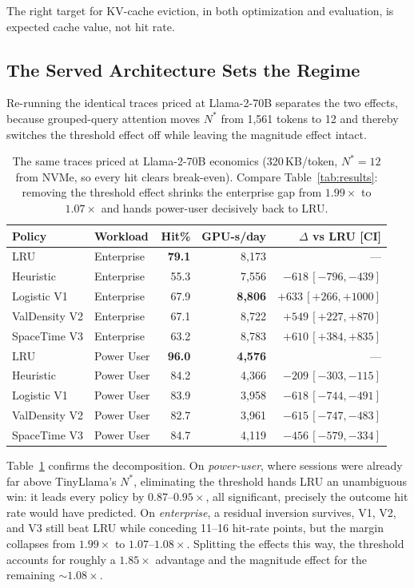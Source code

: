 \documentclass[letterpaper,twocolumn,10pt]{article}
\begin{document}
The right target for KV-cache eviction, in both optimization and evaluation, is expected cache value, not hit rate.

\subsection{The Served Architecture Sets the Regime}
\label{sec:arch}

Re-running the identical traces priced at Llama-2-70B separates the two effects, because grouped-query attention moves $N^{*}$ from 1,561 tokens to 12 and thereby switches the threshold effect off while leaving the magnitude effect intact.

\begin{table}[t]
\centering
\caption{The same traces priced at Llama-2-70B economics (320\,KB/token, $N^{*}{=}12$ from NVMe, so every hit clears break-even). Compare Table~\ref{tab:results}: removing the threshold effect shrinks the enterprise gap from $1.99\times$ to $1.07\times$ and hands power-user decisively back to LRU.}
\label{tab:arch}
\footnotesize
\setlength{\tabcolsep}{2pt}
\begin{tabular}{@{}llrrr@{}}
\toprule
Policy & Workload & Hit\% & GPU-s/day & $\Delta$ vs LRU [CI] \\
\midrule
LRU           & Enterprise & \textbf{79.1} & 8,173 & --- \\
Heuristic     & Enterprise & 55.3 & 7,556 & $-618$\,$[-796,-439]$ \\
Logistic V1   & Enterprise & 67.9 & \textbf{8,806} & $+633$\,$[+266,+1000]$ \\
ValDensity V2 & Enterprise & 67.1 & 8,722 & $+549$\,$[+227,+870]$ \\
SpaceTime V3  & Enterprise & 63.2 & 8,783 & $+610$\,$[+384,+835]$ \\
\midrule
LRU           & Power User & \textbf{96.0} & \textbf{4,576} & --- \\
Heuristic     & Power User & 84.2 & 4,366 & $-209$\,$[-303,-115]$ \\
Logistic V1   & Power User & 83.9 & 3,958 & $-618$\,$[-744,-491]$ \\
ValDensity V2 & Power User & 82.7 & 3,961 & $-615$\,$[-747,-483]$ \\
SpaceTime V3  & Power User & 84.7 & 4,119 & $-456$\,$[-579,-334]$ \\
\bottomrule
\end{tabular}
\end{table}

Table~\ref{tab:arch} confirms the decomposition. On \emph{power-user}, where sessions were already far above TinyLlama's $N^{*}$, eliminating the threshold hands LRU an unambiguous win: it leads every policy by $0.87$--$0.95\times$, all significant, precisely the outcome hit rate would have predicted. On \emph{enterprise}, a residual inversion survives, V1, V2, and V3 still beat LRU while conceding 11--16 hit-rate points, but the margin collapses from $1.99\times$ to $1.07$--$1.08\times$. Splitting the effects this way, the threshold accounts for roughly a $1.85\times$ advantage and the magnitude effect for the remaining ${\sim}1.08\times$.
\end{document}
